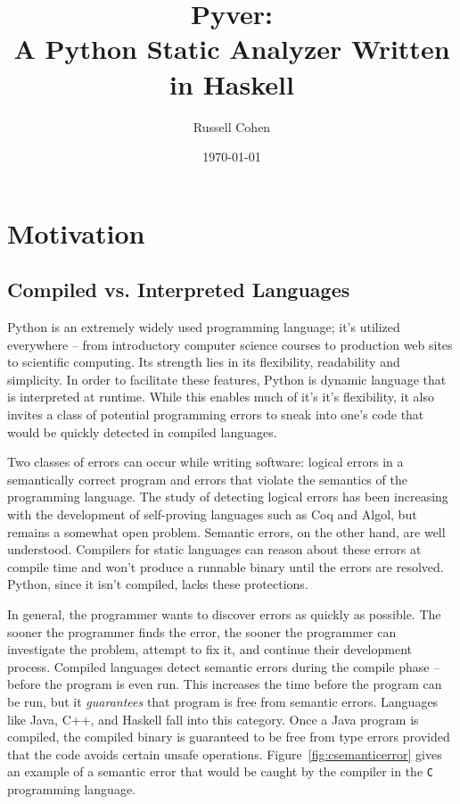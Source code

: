 \documentclass{article}[12pt]
\author{Russell Cohen}
\title{Pyver: \\ A Python Static Analyzer Written in Haskell}
\date{\today}
\begin{document}
\renewcommand{\theFancyVerbLine}{
      \sffamily\textcolor[rgb]{0.5,0.5,0.5}{\scriptsize\arabic{FancyVerbLine}}}

\maketitle
\section{Motivation}

\subsection{Compiled vs. Interpreted Languages}
\doublespacing

Python is an extremely widely used programming language; it's utilized everywhere -- from
introductory computer science courses to production web sites to scientific computing. Its strength
lies in its flexibility, readability and simplicity. In order to facilitate these features, Python
is dynamic language that is interpreted at runtime. While this enables much of it's it's
flexibility, it also invites a class of potential programming errors to sneak into one's code that
would be quickly detected in compiled languages.

Two classes of errors can occur while writing software: logical errors in a semantically correct program and
errors that violate the semantics of the programming language. The study of detecting logical errors has been
increasing with the development of self-proving languages such as Coq and Algol, but remains a somewhat open problem.
Semantic errors, on the other hand, are well understood. Compilers for static languages can reason about these
errors at compile time and won't produce a runnable binary until the errors are resolved. Python, since it isn't
compiled, lacks these protections.

In general, the programmer wants to discover errors as quickly as possible. The sooner the
programmer finds the error, the sooner the programmer can investigate the problem, attempt to fix it, and
continue their development process. Compiled languages detect semantic errors during the compile phase
-- before the program is even run. This increases the time before the program can be run, but it
\emph{guarantees} that program is free from semantic errors. Languages like Java, C++, and Haskell
fall into this category. Once a Java program is compiled, the compiled binary is guaranteed to be
free from type errors provided that the code avoids certain unsafe operations.
Figure~\ref{fig:csemanticerror} gives an example of a semantic error that would be caught by the
compiler in the \texttt{C} programming language. 
\end{document}
